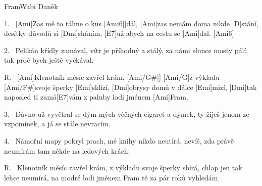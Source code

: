\begin{song}{Fram}{Wabi Daněk}

\begin{xverse}{1.~}
[Ami]Zas mě to táhne o kus [Ami6|]{dál,} [Ami]{zas} nemám doma nikde [D]stání,
desítky důvodů si [Dmi]sháním, [E7]už abych na cestu se [Ami]dal. [Ami6]{}
\end{xverse}

\begin{xverse}{2.~}
Pelikán křídly zamával, vítr je příhodný a stálý,
za námi slunce mosty pálí, tak proč bych ještě vyčkával.
\end{xverse}

\begin{xverse}{R.~}
[Ami]Klenotník měsíc zavřel krám, [Ami/G#|]{} 
[Ami/G]{z vý}kladu [Ami/F#]svoje šperky [Emi]sklízí,
[Dmi]obrysy domů v dálce [Emi]mizí, 
[Dmi]tak naposled ti zamá[E7]vám
z paluby lodi jménem [Ami]Fram.
\end{xverse}

\begin{xverse}{3.~}
Dávno už vyvětral se dým mých věčných cigaret a dýmek,
ty žiješ jenom ze vzpomínek, a já se stále nevracím.
\end{xverse}

\begin{xverse}{4.~}
Námořní mapy pokryl prach, mé knihy nikdo neutírá,
nevíš, zda právě neumírám tam někde na ledových krách.
\end{xverse}

\begin{xverse}{R.~}
Klenotník měsíc zavřel krám, z výkladu svoje šperky sbírá,
chlap jen tak lehce neumírá, na modré lodi jménem Fram
tě za pár roků vyhledám.
\end{xverse}

\end{song}
\chords{ \chordAmiSix \chordAmiGis \chordAmiG \chordAmiFis }

